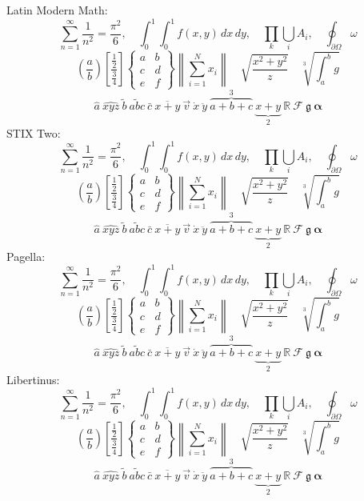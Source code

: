 \documentclass{article}
\newcommand\sample{%
\[ \sum_{n=1}^{\infty}\frac{1}{n^2}=\frac{\pi^2}{6},\quad \int_0^1\!\!\int_0^1 f(x,y)\,dx\,dy,\quad
   \prod_{k} \bigcup_{i} A_i ,\quad \oint_{\partial\Omega}\omega \]
\[ \left( \frac{a}{b} \right) \left[ \frac{\frac{1}{2}}{\frac{3}{4}} \right] \left\{ \begin{matrix} a & b \\ c & d \\ e & f \end{matrix} \right\}
   \left\| \sum_{i=1}^{N} x_i \right\| \quad \sqrt{\frac{x^2+y^2}{z}} \quad \sqrt[3]{\int_a^b g} \]
\[ \hat{a}\ \widehat{xyz}\ \tilde{b}\ \widetilde{abc}\ \bar{c}\ \overline{x+y}\ \vec{v}\ \dot{x}\ \ddot{y}\
   \overbrace{a+b+c}^{3}\ \underbrace{x+y}_{2}\ \mathbb{R}\ \mathcal{F}\ \mathfrak{g}\ \symbf{\alpha} \]}
\begin{document}
Latin Modern Math: \sample
STIX Two: {\sample}
Pagella: {\sample}
Libertinus: {\sample}
\end{document}
